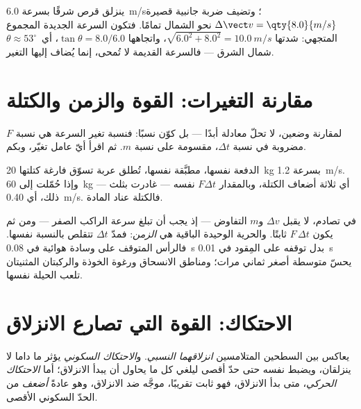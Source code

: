 \begin{example}\label{ex:g11:forces-and-motion:kick}
ينزلق قرص شرقًا بسرعة \qty{6.0}{m/s}؛ وتضيف ضربة جانبية قصيرة
$\Delta\vect v = \qty{8.0}{m/s}$ نحو الشمال تمامًا. فتكون السرعة الجديدة
المجموع المتجهي: شدتها $\sqrt{6.0^2 + 8.0^2} = \qty{10.0}{m/s}$،
واتجاهها $\tan\theta = 8.0/6.0$، أي\ $\theta \approx 53^\circ$ شمال
الشرق --- فالسرعة القديمة لا تُمحى، إنما يُضاف إليها التغير.
\end{example}

\section{مقارنة التغيرات: القوة والزمن والكتلة}

\begin{method}\label{met:g11:forces-and-motion:ratio}
لمقارنة وضعين، لا تحلّ معادلة أبدًا --- بل كوّن نسبًا: فنسبة
تغير السرعة هي نسبة $F$ مضروبة في نسبة $\Delta t$،
مقسومة على نسبة $m$. ثم اقرأ أيّ عامل تغيّر، وبكم.
\end{method}

\begin{example}\label{ex:g11:forces-and-motion:cart}
الدفعة نفسها، مطبَّقة  نفسها، تُطلق عربة تسوّق فارغة
كتلتها \qty{20}{kg} بسرعة \qty{1.2}{m/s}. وإذا حُمّلت إلى
\qty{60}{kg} --- أي ثلاثة أضعاف الكتلة، وبالمقدار $F\Delta t$ نفسه --- غادرت
بثلث ذلك، أي \qty{0.40}{m/s}. فالكتلة عناد المادة.
\end{example}

\begin{remark}\label{rem:g11:forces-and-motion:airbag}
في تصادم، لا يقبل $\Delta v$ و$m$ التفاوض --- إذ يجب أن تبلغ
سرعة الراكب الصفر --- ومن ثم يكون $F\,\Delta t$ ثابتًا. والحرية الوحيدة
الباقية هي \emph{الزمن}: فمدّ $\Delta t$ تتقلص  بالنسبة
نفسها. فالرأس المتوقف على وسادة هوائية في \qty{0.08}{s} بدل توقفه على
المِقود في \qty{0.01}{s} يحسّ  متوسطة أصغر ثماني مرات؛
ومناطق الانسحاق ورغوة الخوذة والركبتان المثنيتان تلعب الحيلة نفسها.
\end{remark}

\section{الاحتكاك: القوة التي تصارع الانزلاق}

\begin{definition}\label{def:g11:forces-and-motion:friction}
يعاكس  بين السطحين المتلامسين \emph{انزلاقهما
النسبي}. و\emph{الاحتكاك السكوني} يؤثر ما داما
لا ينزلقان، ويضبط نفسه حتى حدّ أقصى ليلغي كل ما يحاول
أن يبدأ الانزلاق؛ أما \emph{الاحتكاك الحركي}،
متى بدأ الانزلاق، فهو ثابت تقريبًا، موجَّه ضد
الانزلاق، وهو عادةً \emph{أضعف} من الحدّ السكوني الأقصى.
\end{definition}

